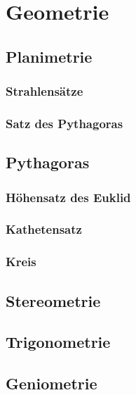 \section{Geometrie}
\subsection{Planimetrie}
\subsubsection{Strahlensätze}
\subsubsection{Satz des Pythagoras}

\subsection{Pythagoras}








\subsubsection{Höhensatz des Euklid}
\subsubsection{Kathetensatz}

\subsubsection{Kreis}


\subsection{Stereometrie}
\subsection{Trigonometrie}
\subsection{Geniometrie}